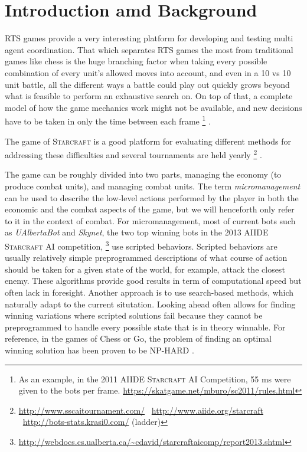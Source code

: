 \section{Introduction amd Background}
RTS games provide a very interesting platform for developing and testing multi agent coordination.
That which separates RTS games the most from traditional games like chess is the huge branching factor when taking every possible combination of every unit's allowed moves into account, and even in a 10 vs 10 unit battle, all the different ways a battle could play out quickly grows beyond what is feasible to perform an exhaustive search on.
On top of that, a complete model of how the game mechanics work might not be available, and new decisions have to be taken in only the time between each frame
\footnote{
As an example, in the 2011 AIIDE \textsc{Starcraft} AI Competition, 55 ms were given to the bots per frame.
\url{https://skatgame.net/mburo/sc2011/rules.html}
}
.

The game of \textsc{Starcraft} is a good platform for evaluating different methods for addressing these difficulties and several tournaments are held yearly
\footnote{
\url{http://www.sscaitournament.com/} \
\url{http://www.aiide.org/starcraft} \
\url{http://bots-stats.krasi0.com/} (ladder)
}
.

The game can be roughly divided into two parts, managing the economy (to produce combat units), and managing combat units.
The term \emph{micromanagement} can be used to describe the low-level actions performed by the player in both the economic and the combat aspects of the game, but we will henceforth only refer to it in the context of combat.
For micromanagement, most of current bots such as \emph{UAlbertaBot} and \emph{Skynet}, the two top winning bots in the 2013 AIIDE \textsc{Starcraft} AI competition,
\footnote{
\url{http://webdocs.cs.ualberta.ca/~cdavid/starcraftaicomp/report2013.shtml}
}
use scripted behaviors.
Scripted behaviors are usually relatively simple preprogrammed descriptions of what course of action should be taken for a given state of the world, for example, attack the closest enemy.
These algorithms provide good results in term of computational speed but often lack in foresight.
Another approach is to use search-based methods, which naturally adapt to the current situtation.
Looking ahead often allows for finding winning variations where scripted solutions fail because they cannot be preprogrammed to handle every possible state that is in theory winnable.
For reference, in the games of Chess or Go, the problem of finding an optimal winning solution has been proven to be NP-HARD \cite{nphard}.

